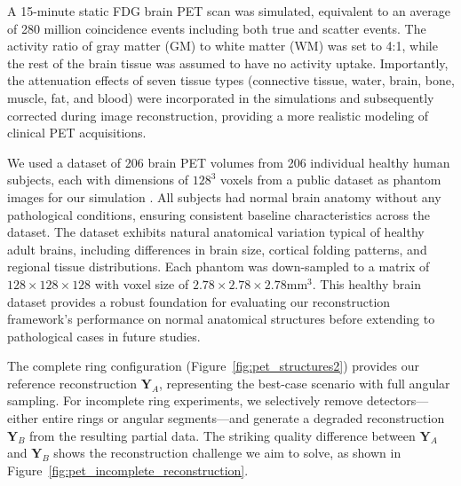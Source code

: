 \documentclass[aps,prb,preprint,groupedaddress,showkeys]{revtex4}
\begin{document}
A 15-minute static FDG brain PET scan was simulated, equivalent to an average of 280 million coincidence events including both true and scatter events. The activity ratio of gray matter (GM) to white matter (WM) was set to 4:1, while the rest of the brain tissue was assumed to have no activity uptake. Importantly, the attenuation effects of seven tissue types (connective tissue, water, brain, bone, muscle, fat, and blood) were incorporated in the simulations and subsequently corrected during image reconstruction, providing a more realistic modeling of clinical PET acquisitions.

We used a dataset of 206 brain PET volumes from 206 individual healthy human subjects, each with dimensions of $128^3$ voxels from a public dataset as phantom images for our simulation \cite{Han2023DiffusionPET}. All subjects had normal brain anatomy without any pathological conditions, ensuring consistent baseline characteristics across the dataset. The dataset exhibits natural anatomical variation typical of healthy adult brains, including differences in brain size, cortical folding patterns, and regional tissue distributions. Each phantom was down-sampled to a matrix of $128 \times 128 \times 128$ with voxel size of $2.78 \times 2.78 \times 2.78$mm$^3$. This healthy brain dataset provides a robust foundation for evaluating our reconstruction framework's performance on normal anatomical structures before extending to pathological cases in future studies.

The complete ring configuration (Figure~\ref{fig:pet_structures2}) provides our reference reconstruction $\mathbf{Y}_A$, representing the best-case scenario with full angular sampling. For incomplete ring experiments, we selectively remove detectors—either entire rings or angular segments—and generate a degraded reconstruction $\mathbf{Y}_B$ from the resulting partial data. The striking quality difference between $\mathbf{Y}_A$ and $\mathbf{Y}_B$ shows the reconstruction challenge we aim to solve, as shown in Figure~\ref{fig:pet_incomplete_reconstruction}.

\end{document}
